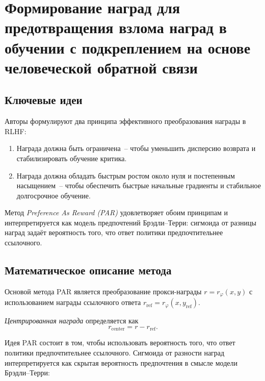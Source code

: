 \section{Формирование наград для предотвращения взлома наград в обучении
 с подкреплением на основе человеческой обратной связи}


\subsection{Ключевые идеи}

Авторы формулируют два принципа эффективного преобразования награды в RLHF:

\begin{enumerate}
    \item Награда должна быть ограничена~-- чтобы уменьшить дисперсию возврата и 
        стабилизировать обучение критика.
    \item Награда должна обладать быстрым ростом около нуля и постепенным 
        насыщением~-- чтобы обеспечить быстрые начальные градиенты и стабильное 
        долгосрочное обучение.
\end{enumerate}

Метод \emph{Preference As Reward (PAR)} удовлетворяет обоим принципам и 
интерпретируется как модель предпочтений Брэдли--Терри: сигмоида от разницы 
наград задаёт вероятность того, что ответ политики предпочтительнее ссылочного.


\subsection{Математическое описание метода}

Основой метода PAR является преобразование прокси-награды $r = r_\varphi(x,y)$
с использованием награды ссылочного ответа 
$r_{\mathrm{ref}} = r_\varphi(x, y_{\mathrm{ref}})$.

\begin{definition}
    \label{def:centered_reward_short}
    \emph{Центрированная награда} определяется как
    \begin{equation}
        r_{\mathrm{center}} = r - r_{\mathrm{ref}}.
    \end{equation}
\end{definition}

Идея PAR состоит в том, чтобы использовать вероятность того, что ответ политики 
предпочтительнее ссылочного. Сигмоида от разности наград интерпретируется 
как скрытая вероятность предпочтения
в смысле модели Брэдли--Терри:

